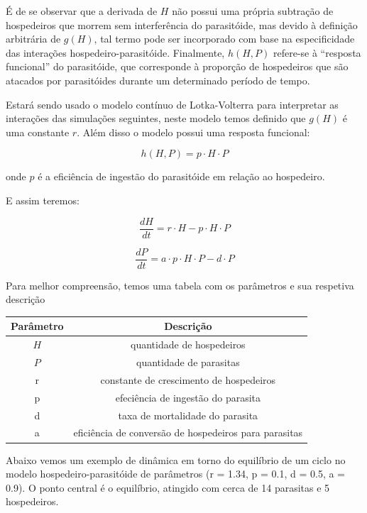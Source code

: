 É de se observar que a derivada de $H$ não possui uma própria subtração de hospedeiros que morrem sem interferência do parasitóide, mas devido à definição arbitrária de $g(H)$, tal termo pode ser incorporado com base na especificidade das interações hospedeiro-parasitóide. Finalmente, $h(H,P)$ refere-se à ``resposta funcional” do parasitóide, que corresponde à proporção de hospedeiros que são atacados por parasitóides durante um determinado período de tempo.

Estará sendo usado o modelo contínuo de Lotka-Volterra para interpretar as interações das simulações seguintes, neste modelo temos definido que $g(H)$ é uma constante $r$. Além disso o modelo possui uma resposta funcional:

\[ h(H,P) = p \cdot H \cdot P \]

onde $p$ é a eficiência de ingestão do parasitóide em relação ao hospedeiro.

E assim teremos: 

\[ \frac{dH}{dt} = r \cdot H - p \cdot H \cdot P   \]

\[ \frac{dP}{dt} = a \cdot p \cdot H \cdot P - d \cdot P  \]

\medskip
Para melhor compreensão, temos uma tabela com os parâmetros e sua respetiva descrição

\medskip
\begin{center}
\begin{tabular}{|c|c|}
            \hline
            Parâmetro & Descrição\tabularnewline
            \hline
            $H$ & quantidade de hospedeiros\tabularnewline
            \hline
            $P$ & quantidade de parasitas\tabularnewline
            \hline
            r & constante de crescimento  de hospedeiros \tabularnewline
            \hline
            p & efeciência de ingestão do parasita \tabularnewline
            \hline
            d &  taxa de mortalidade do parasita \tabularnewline
            \hline
            a & eficiência de conversão de hospedeiros para parasitas  \tabularnewline
            \hline
\end{tabular}
\end{center}

\bigskip

Abaixo vemos um exemplo de dinâmica em torno do equilíbrio de um ciclo no modelo hospedeiro-parasitóide de parâmetros (r = 1.34, p = 0.1,  d = 0.5, a = 0.9). O ponto central é o equilíbrio, atingido com cerca de 14 parasitas e 5 hospedeiros.

